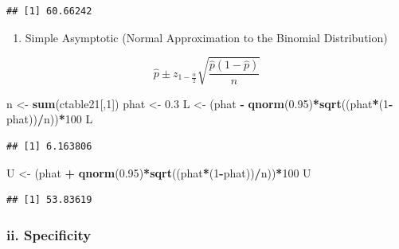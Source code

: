 \documentclass[]{article}
\newenvironment{Shaded}{\begin{snugshade}}{\end{snugshade}}
\newcommand{\DecValTok}[1]{\textcolor[rgb]{0.00,0.00,0.81}{#1}}
\newcommand{\FloatTok}[1]{\textcolor[rgb]{0.00,0.00,0.81}{#1}}
\newcommand{\KeywordTok}[1]{\textcolor[rgb]{0.13,0.29,0.53}{\textbf{#1}}}
\newcommand{\NormalTok}[1]{#1}
\newcommand{\OperatorTok}[1]{\textcolor[rgb]{0.81,0.36,0.00}{\textbf{#1}}}
\newcommand{\StringTok}[1]{\textcolor[rgb]{0.31,0.60,0.02}{#1}}
\providecommand{\tightlist}{%
  \setlength{\itemsep}{0pt}\setlength{\parskip}{0pt}}
\begin{document}
\begin{verbatim}
## [1] 60.66242
\end{verbatim}

\begin{enumerate}
\def\labelenumi{\arabic{enumi}.}
\setcounter{enumi}{1}
\tightlist
\item
  Simple Asymptotic (Normal Approximation to the Binomial Distribution)
\end{enumerate}

\[
\hat{p}\pm z_{1-\frac{\alpha}{2}} \sqrt{\frac{\hat{p}(1-\hat{p})}{n}}
\]

\begin{Shaded}
\begin{Highlighting}[]
\NormalTok{n <-}\StringTok{ }\KeywordTok{sum}\NormalTok{(ctable21[,}\DecValTok{1}\NormalTok{])}
\NormalTok{phat <-}\StringTok{ }\FloatTok{0.3}
\NormalTok{L <-}\StringTok{ }\NormalTok{(phat }\OperatorTok{-}\StringTok{ }\KeywordTok{qnorm}\NormalTok{(}\FloatTok{0.95}\NormalTok{)}\OperatorTok{*}\KeywordTok{sqrt}\NormalTok{((phat}\OperatorTok{*}\NormalTok{(}\DecValTok{1}\OperatorTok{-}\NormalTok{phat))}\OperatorTok{/}\NormalTok{n))}\OperatorTok{*}\DecValTok{100}
\NormalTok{L}
\end{Highlighting}
\end{Shaded}

\begin{verbatim}
## [1] 6.163806
\end{verbatim}

\begin{Shaded}
\begin{Highlighting}[]
\NormalTok{U <-}\StringTok{ }\NormalTok{(phat }\OperatorTok{+}\StringTok{ }\KeywordTok{qnorm}\NormalTok{(}\FloatTok{0.95}\NormalTok{)}\OperatorTok{*}\KeywordTok{sqrt}\NormalTok{((phat}\OperatorTok{*}\NormalTok{(}\DecValTok{1}\OperatorTok{-}\NormalTok{phat))}\OperatorTok{/}\NormalTok{n))}\OperatorTok{*}\DecValTok{100}
\NormalTok{U }
\end{Highlighting}
\end{Shaded}

\begin{verbatim}
## [1] 53.83619
\end{verbatim}

\hypertarget{ii.-specificity}{%
\subsubsection{ii. Specificity}\label{ii.-specificity}}
\end{document}
